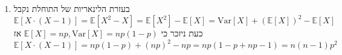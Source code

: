 \documentclass[12pt, a4paper]{article}
\newcommand{\Bin}{\mathrm{Bin}}
\newcommand{\Var}{\mathrm{Var}}
\newcommand{\EE}{\mathbb{E}}
\begin{document}
\begin{enumerate}
\begin{enumerate}
$(1)$:
עבור
$k=0,1$
המחוברים מתאפסים ולכן הסכום מתחיל מ-$2$.

$(2)$:
השתמשנו בזהות
$k\binom{n}{k}=
(n-1)\binom{n-1}{k-1}$.

$(3)$:
השתמשנו באותה הזהות כאשר
$(k-1)\binom{n-1}{k-1}=
(n-1)\binom{n-2}{k-2}$.

$(4)$:
עשינו שינוי אינדקס
$\ell=k-2$.

$(5)$:
הסכום שווה
$1$
כי זהו סכום כל ההסתברויות של משתמנה מסוג
$\Bin(n-2,p)$.

\noindent\rule{15cm}{0.4pt}

\item
בעזרת הלינאריות של התוחלת נקבל
$$\EE[X\cdot (X-1)]=
\EE[X^2-X]
=\EE[X^2]-\EE[X]=
\Var[X]+(\EE[X])^2-\EE[X]$$
כעת ניזכר כי
$\EE[X]=np,
\Var[X]=np(1-p)$
אז
$$\EE[X\cdot (X-1)]
=np(1-p)+(np)^2-np
=np(1-p+np-1)=n(n-1)p^2$$
\end{enumerate}

\end{enumerate}
\end{document}
